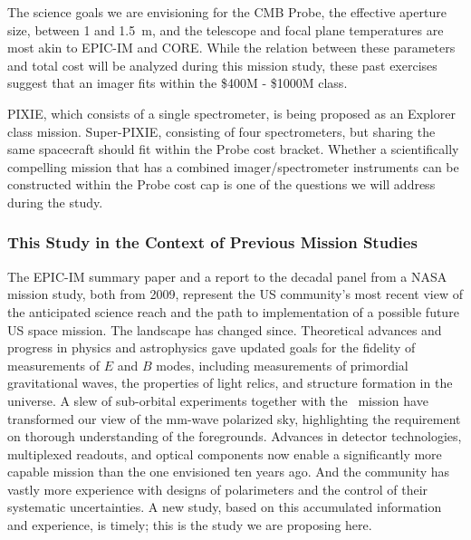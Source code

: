 
The science goals we are envisioning for the CMB Probe, the effective aperture size, between 1 and 1.5~m,
and the telescope and focal plane temperatures are most akin to EPIC-IM and CORE. While the relation 
between these parameters and total cost will be analyzed during this 
mission study, these past exercises suggest that an imager fits within the \$400M - \$1000M class.

PIXIE, which consists of a single spectrometer, is being proposed as an Explorer class mission. 
Super-PIXIE, consisting of four spectrometers, but sharing the same spacecraft should fit 
within the Probe cost bracket. Whether a scientifically compelling mission that has 
a combined imager/spectrometer instruments can be constructed within the Probe cost cap 
is one of the questions we will address during the study. 


\vspace{-0.18in}

\subsubsection{This Study in the Context of Previous Mission Studies} 

\vspace{-0.05in}

The EPIC-IM summary paper and a report to the decadal panel from a NASA mission study, both from 2009, represent 
the US community's most recent view of the anticipated 
science reach and the path to implementation of a possible future US space mission. The landscape 
has changed since.  Theoretical advances and progress in physics and astrophysics gave updated 
goals for the fidelity of measurements of $E$ and $B$ modes, including measurements of primordial 
gravitational waves, the properties of light relics, and structure formation in the universe. A 
slew of sub-orbital experiments together with the \planck\ mission have 
transformed our view of the mm-wave polarized sky, highlighting the requirement on 
thorough understanding of the foregrounds. Advances in detector technologies, multiplexed readouts,
and optical components now enable a significantly more capable mission than the one envisioned
ten years ago. And the community has vastly more experience with designs of polarimeters and 
the control of their systematic uncertainties.  A new study, based on this accumulated information and 
experience, is timely; this is the study we are proposing here. 

